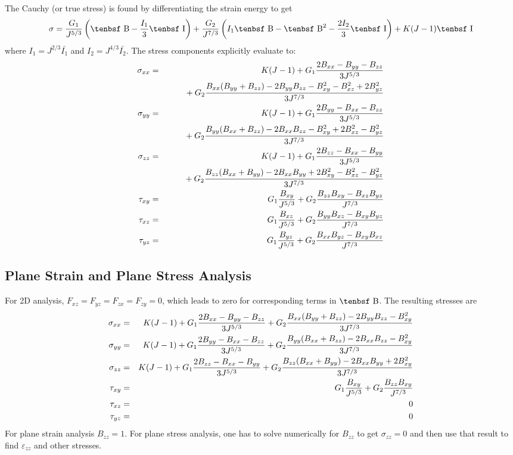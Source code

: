 \documentclass[11pt]{article}
\def\B{\hbox{\tenbsf B}}
\def\e#1{\varepsilon_{#1}}
\def\I{\hbox{\tenbsf I}}
\def\s#1{\sigma_{#1}}
\def\t#1{\tau_{#1}}
\begin{document}
The Cauchy (or true stress) is found by differentiating the strain energy to get
\begin{equation}
     \sigma = {G_1\over J^{5/3}}\left(\B - {I_1\over3}\I\right)
                     +  {G_2\over J^{7/3}}\left(I_1\B - \B^2 - {2I_2\over3}\I\right)   + K(J-1)\I
\end{equation}
where $I_1 = J^{2/3}\bar{I_1}$ and $I_2 = J^{4/3}\bar{I_2}$. The stress components explicitly evaluate to:
\begin{eqnarray}
      \s{xx} & = & K(J-1) + G_1{2B_{xx}-B_{yy}-B_{zz}\over 3J^{5/3}}   \nonumber\\
                  && \qquad\mbox{}    + G_2{B_{xx}(B_{yy}+B_{zz})-2B_{yy}B_{zz}-B_{xy}^2-B_{xz}^2+2B_{yz}^2\over 3J^{7/3} }\\
      \s{yy} & = & K(J-1) + G_1{2B_{yy}-B_{xx}-B_{zz}\over 3J^{5/3}}   \nonumber\\
                  && \qquad\mbox{}    + G_2{B_{yy}(B_{xx}+B_{zz})-2B_{xx}B_{zz}-B_{xy}^2+2B_{xz}^2-B_{yz}^2\over 3J^{7/3} }\\
      \s{zz} & = &  K(J-1) + G_1{2B_{zz}-B_{xx}-B_{yy}\over 3J^{5/3}}   \nonumber\\
                  && \qquad\mbox{}    + G_2{B_{zz}(B_{xx}+B_{yy})-2B_{xx}B_{yy}+2B_{xy}^2-B_{xz}^2-B_{yz}^2\over 3J^{7/3} }\\
       \t{xy} & = &  G_1{B_{xy}\over J^{5/3}} + G_2{B_{zz}B_{xy}-B_{xz}B_{yz}\over J^{7/3}}\\
       \t{xz} & = & G_1{B_{xz}\over J^{5/3}} + G_2{B_{yy}B_{xz}-B_{xy}B_{yz}\over J^{7/3}}\\
       \t{yz} & = & G_1{B_{yz}\over J^{5/3}} + G_2{B_{xx}B_{yz}-B_{xy}B_{xz}\over J^{7/3}}
\end{eqnarray}

\subsection{Plane Strain and Plane Stress Analysis}

For 2D analysis, $F_{xz}=F_{yz}=F_{zx}=F_{zy}=0$, which leads to zero for corresponding terms in $\B$. The resulting stresses are
\begin{eqnarray}
      \s{xx} & = & K(J-1) + G_1{2B_{xx}-B_{yy}-B_{zz}\over 3J^{5/3}}  
                    + G_2{B_{xx}(B_{yy}+B_{zz})-2B_{yy}B_{zz}-B_{xy}^2\over 3J^{7/3} }\\
      \s{yy} & = & K(J-1) + G_1{2B_{yy}-B_{xx}-B_{zz}\over 3J^{5/3}}   
                     + G_2{B_{yy}(B_{xx}+B_{zz})-2B_{xx}B_{zz}-B_{xy}^2\over 3J^{7/3} }\\
      \s{zz} & = &  K(J-1) + G_1{2B_{zz}-B_{xx}-B_{yy}\over 3J^{5/3}}   
                     + G_2{B_{zz}(B_{xx}+B_{yy})-2B_{xx}B_{yy}+2B_{xy}^2\over 3J^{7/3} }\\
       \t{xy} & = &  G_1{B_{xy}\over J^{5/3}} + G_2{B_{zz}B_{xy}\over J^{7/3}}\\
       \t{xz} & = & 0 \\
       \t{yz} & = & 0
\end{eqnarray}
For plane strain analysis $B_{zz}=1$. For plane stress analysis, one has to solve numerically for $B_{zz}$ to get $\s{zz}=0$ and then use that result to find $\e{zz}$ and other stresses.
\end{document}
